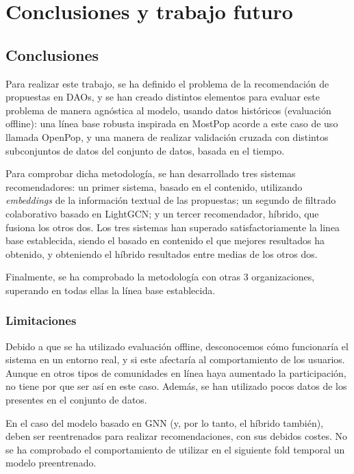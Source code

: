 \chapter{Conclusiones y trabajo futuro}

\section{Conclusiones}

Para realizar este trabajo, se ha definido el problema de la recomendación de propuestas en DAOs, y se han creado distintos elementos para evaluar este problema de manera agnóstica al modelo, usando datos históricos (evaluación offline): una línea base robusta inspirada en MostPop acorde a este caso de uso llamada OpenPop, y una manera de realizar validación cruzada con distintos subconjuntos de datos del conjunto de datos, basada en el tiempo.

Para comprobar dicha metodología, se han desarrollado tres sistemas recomendadores: un primer sistema, basado en el contenido, utilizando \textit{embeddings} de la información textual de las propuestas; un segundo de filtrado colaborativo basado en LightGCN; y un tercer recomendador, híbrido, que fusiona los otros dos. Los tres sistemas han superado satisfactoriamente la linea base establecida, siendo el basado en contenido el que mejores resultados ha obtenido, y obteniendo el híbrido resultados entre medias de los otros dos.

Finalmente, se ha comprobado la metodología con otras 3 organizaciones, superando en todas ellas la línea base establecida.

\subsection{Limitaciones}

Debido a que se ha utilizado evaluación offline, desconocemos cómo funcionaría el sistema en un entorno real, y si este afectaría al comportamiento de los usuarios. Aunque en otros tipos de comunidades en línea haya aumentado la participación, no tiene por que ser así en este caso. Además, se han utilizado pocos datos de los presentes en el conjunto de datos.

En el caso del modelo basado en GNN (y, por lo tanto, el híbrido también), deben ser reentrenados para realizar recomendaciones, con sus debidos costes. No se ha comprobado el comportamiento de utilizar en el siguiente fold temporal un modelo preentrenado.

